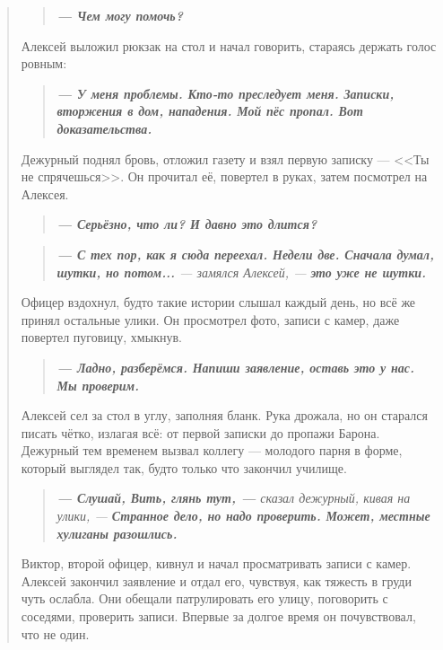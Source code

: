 \documentclass[12pt,a4paper]{book}
\newenvironment{dialogue}{\begin{quote}\itshape}{\end{quote}}
\begin{document}
\begin{dialogue}
\begin{dialogue}
\textbf{--- Чем могу помочь?}
\end{dialogue}

Алексей выложил рюкзак на стол и начал говорить, стараясь держать голос ровным:

\begin{dialogue}
\textbf{--- У меня проблемы. Кто-то преследует меня. Записки, вторжения в дом, нападения. Мой пёс пропал. Вот доказательства.}
\end{dialogue}

Дежурный поднял бровь, отложил газету и взял первую записку --- <<Ты не спрячешься>>. Он прочитал её, повертел в руках, затем посмотрел на Алексея.

\begin{dialogue}
\textbf{--- Серьёзно, что ли? И давно это длится?}
\end{dialogue}

\begin{dialogue}
\textbf{--- С тех пор, как я сюда переехал. Недели две. Сначала думал, шутки, но потом...} --- замялся Алексей, --- \textbf{это уже не шутки.}
\end{dialogue}

Офицер вздохнул, будто такие истории слышал каждый день, но всё же принял остальные улики. Он просмотрел фото, записи с камер, даже повертел пуговицу, хмыкнув.

\begin{dialogue}
\textbf{--- Ладно, разберёмся. Напиши заявление, оставь это у нас. Мы проверим.}
\end{dialogue}

Алексей сел за стол в углу, заполняя бланк. Рука дрожала, но он старался писать чётко, излагая всё: от первой записки до пропажи Барона. Дежурный тем временем вызвал коллегу --- молодого парня в форме, который выглядел так, будто только что закончил училище.

\begin{dialogue}
\textbf{--- Слушай, Вить, глянь тут, ---} сказал дежурный, кивая на улики, --- \textbf{Странное дело, но надо проверить. Может, местные хулиганы разошлись.}
\end{dialogue}

Виктор, второй офицер, кивнул и начал просматривать записи с камер. Алексей закончил заявление и отдал его, чувствуя, как тяжесть в груди чуть ослабла. Они обещали патрулировать его улицу, поговорить с соседями, проверить записи. Впервые за долгое время он почувствовал, что не один.


\end{dialogue}
\end{document}
